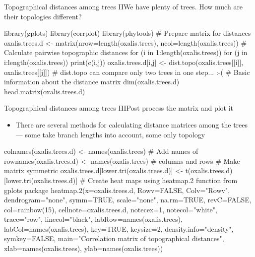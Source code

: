 \documentclass[compress, ucs, xelatex, 11pt, xcolor=svgnames,
  hyperref={
    bookmarks=true,
    unicode=true,
    colorlinks=true,
    pdftitle={Molecular data in R},
    plainpages=false,
    pdfauthor={Vojtech Zeisek},
    pdfsubject={Course about phylogeny and evolution in R},
    pdfcreator={XeLaTeX},
    pdfkeywords={R, evolution, phylogeny, molecular data},
    linkcolor=Tomato,
    anchorcolor=SaddleBrown,
    citecolor=Goldenrod,
    filecolor=DarkMagenta,
    menucolor=Sienna,
    urlcolor=DarkTurquoise,
    pdftex},
  url={hyphens, lowtilde} %
  ]{beamer}
\begin{document}
\begin{frame}[fragile]{Topographical distances among trees II}{We have plenty of trees. How much are their topologies different?}
  \begin{spluscode}
    library(gplots)
    library(corrplot)
    library(phytools)
    # Prepare matrix for distances
    oxalis.trees.d <- matrix(nrow=length(oxalis.trees),
      ncol=length(oxalis.trees))
    # Calculate pairwise topographic distances
    for (i in 1:length(oxalis.trees)) {
      for (j in i:length(oxalis.trees)) {
        print(c(i,j))
        oxalis.trees.d[i,j] <- dist.topo(oxalis.trees[[i]],
          oxalis.trees[[j]])
      }
    } # dist.topo can compare only two trees in one step... :-(
    # Basic information about the distance matrix
    dim(oxalis.trees.d)
    head.matrix(oxalis.trees.d)
  \end{spluscode}
\end{frame}

\begin{frame}[fragile]{Topographical distances among trees III}{Post process the matrix and plot it}
  \begin{itemize}
    \item There are several methods for calculating distance matrices among the trees --- some take branch lengths into account, some only topology
  \end{itemize}
  \begin{spluscode}
    colnames(oxalis.trees.d) <- names(oxalis.trees) # Add names of
    rownames(oxalis.trees.d) <- names(oxalis.trees) # columns and rows
    # Make matrix symmetric
    oxalis.trees.d[lower.tri(oxalis.trees.d)] <-
      t(oxalis.trees.d)[lower.tri(oxalis.trees.d)]
    # Create heat maps using heatmap.2 function from gplots package
    heatmap.2(x=oxalis.trees.d, Rowv=FALSE, Colv="Rowv", dendrogram="none",
      symm=TRUE, scale="none", na.rm=TRUE, revC=FALSE, col=rainbow(15),
      cellnote=oxalis.trees.d, notecex=1, notecol="white", trace="row",
      linecol="black", labRow=names(oxalis.trees),
      labCol=names(oxalis.trees), key=TRUE, keysize=2,
      density.info="density", symkey=FALSE, main="Correlation matrix of
      topographical distances", xlab=names(oxalis.trees),
      ylab=names(oxalis.trees))
  \end{spluscode}
\end{frame}
\end{document}
